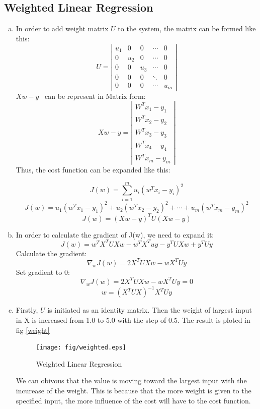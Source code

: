 \documentclass[a4paper, 12pt, titlepage]{article}
\begin{document}
\begin{enumerate}[(a)]
            


\section{Weighted Linear Regression}
\begin{enumerate}[(a)]
    \item In order to add weight matrix $U$ to the system, the matrix can be formed like this:
    \[ U = 
    \left| 
    {\begin{array}{ccccc}
    u_1 & 0 & 0 & \cdots & 0 \\
    0   & u_2 & 0 & \cdots & 0 \\
    0   & 0 & u_3 & \cdots & 0 \\
    0   & 0 & 0 & \ddots & 0 \\
    0   & 0 & 0 & \cdots & u_m
    \end{array}}
    \right|
\]
$Xw-y$~ can be represent in Matrix form:
\[Xw-y=
\left|
{\begin{array}{c}
    W^Tx_1-y_1\\
    W^Tx_2-y_2\\
    W^Tx_3-y_3\\
    W^Tx_4-y_4\\
    W^Tx_m-y_m
\end{array}}
\right|
\]
Thus, the cost function can be expanded like this:

$$J(w)=\sum_{i=1}^mu_i(w^Tx_i-y_i)^2 $$
$$J(w)=u_1(w^Tx_1-y_1)^2+u_2(w^Tx_2-y_2)^2+\cdots+u_m(w^Tx_m-y_m)^2$$
$$J(w)=(Xw-y)^TU(Xw-y)$$
    \item In order to calculate the gradient of J(w), we need to expand it:
        $$J(w)=w^TX^TUXw-w^TX^Tuy-y^TUXw+y^TUy$$
        Calculate the gradient:
        $$\nabla_wJ(w)=2X^TUXw-wX^TUy$$
        Set gradient to 0:
        $$\nabla_wJ(w)=2X^TUXw-wX^TUy=0$$
        $$w=(X^TUX)^{-1}X^TUy$$

    \item Firstly, $U$ is initiated as an identity matrix. Then the weight of largest input in X is increased from 1.0 to 5.0 with the step of 0.5. The result is ploted in fig \ref{weight}
            \begin{figure}[H]
                \centering
                \texttt{[image: fig/weighted.eps]}
                \caption{Weighted Linear Regression}\label{weighted}
            \end{figure}

            We can obivous that the value is moving toward the largest input with the incurease of the weight. This is because that the more weight is given to the specified input, the more influence of the cost will have to the cost function. 


\end{enumerate}
\end{enumerate}
\end{document}
